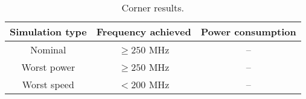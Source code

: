 \begin{table}[H]
	\caption{Corner results.}
	\centering
	\begin{tabular}{| c | c | c |}
		\hline
		Simulation type & Frequency achieved & Power consumption\\
		\hline
		Nominal & $\ge 250$ MHz & -- \\
		\hline
		Worst power & $\ge 250$ MHz & -- \\
		\hline 
		Worst speed & $< 200$ MHz & -- \\
		\hline 
	\end{tabular}
\end{table}






